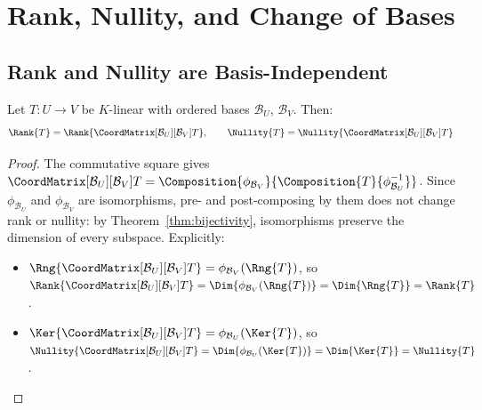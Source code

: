 
\newpage
\section{Rank, Nullity, and Change of Bases}
\label{sec:rank-nullity-change-of-bases}

\subsection{Rank and Nullity are Basis-Independent}

\begin{theorem}
\label{thm:rank-nullity-invariance}
    Let $T: U \to V$ be $K$-linear with ordered bases $\mathcal{B}_U$, $\mathcal{B}_V$.
    Then:
    \[
        \Rank{T} = \Rank{\CoordMatrix[\mathcal{B}_U][\mathcal{B}_V]{T}},
        \qquad
        \Nullity{T} = \Nullity{\CoordMatrix[\mathcal{B}_U][\mathcal{B}_V]{T}}
    \]
\end{theorem}

\begin{proof}
    The commutative square gives
    $\CoordMatrix[\mathcal{B}_U][\mathcal{B}_V]{T}
    = \Composition{\phi_{\mathcal{B}_V}}{\Composition{T}{\phi_{\mathcal{B}_U}^{-1}}}$.
    Since $\phi_{\mathcal{B}_U}$ and $\phi_{\mathcal{B}_V}$ are isomorphisms, pre- and
    post-composing by them does not change rank or nullity: by
    Theorem~\ref{thm:bijectivity}, isomorphisms preserve the dimension of every subspace.
    Explicitly:
    \begin{itemize}
        \item $\Rng{\CoordMatrix[\mathcal{B}_U][\mathcal{B}_V]{T}}
              = \phi_{\mathcal{B}_V}(\Rng{T})$, so
              $\Rank{\CoordMatrix[\mathcal{B}_U][\mathcal{B}_V]{T}}
              = \Dim{\phi_{\mathcal{B}_V}(\Rng{T})}
              = \Dim{\Rng{T}}
              = \Rank{T}$.
        \item $\Ker{\CoordMatrix[\mathcal{B}_U][\mathcal{B}_V]{T}}
              = \phi_{\mathcal{B}_U}(\Ker{T})$, so
              $\Nullity{\CoordMatrix[\mathcal{B}_U][\mathcal{B}_V]{T}}
              = \Dim{\phi_{\mathcal{B}_U}(\Ker{T})}
              = \Dim{\Ker{T}}
              = \Nullity{T}$. \qedhere
    \end{itemize}
\end{proof}

